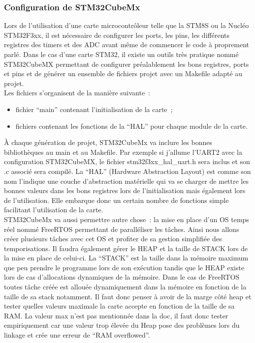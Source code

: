 \documentclass{article}
\begin{document}
\subsubsection{Configuration de STM32CubeMx}

Lors de l'utilisation d'une carte microcontrôleur telle que la STM8S ou la Nucléo STM32F3xx, il est nécessaire de configurer les ports, les pins, les différents registres des timers et des ADC avant même de commencer le code à proprement parlé. Dans le cas d'une carte STM32, il existe un outils très pratique nommé STM32CubeMX permettant de configurer préalablement les bons registres, ports et pins et de générer un ensemble de fichiers projet avec un Makefile adapté au projet. \\

Les fichiers s'organisent de la manière suivante~:
\begin{itemize}
  \item fichier ``main'' contenant l'initialisation de la carte~;
  \item fichiers contenant les fonctions de la ``HAL'' pour chaque module de la carte. 
\end{itemize}

À chaque génération de projet, STM32CubeMx va inclure les bonnes bibliothèques au main et au Makefile. Par exemple si j'allume l'UART2 avec la configuration STM32CubeMX, le fichier stm32f3xx\_hal\_uart.h sera inclus et son .c associé sera compilé. La ``HAL'' (Hardware Abstraction Layout) est comme son nom l'indique une couche d'abstraction matérielle qui va se charger de mettre les bonnes valeurs dans les bons registres lors de l'initialisation mais également lors de l'utilisation. Elle embarque donc un certain nombre de fonctions simple facilitant l'utilisation de la carte. \\

STM32CubeMx va aussi permettre autre chose~: la mise en place d'un OS temps réel nommé FreeRTOS permettant de paralléliser les tâches. Ainsi nous allons créer plusieurs tâches avec cet OS et profiter de sa gestion simplifiée des temporisations. Il faudra également gérer le HEAP et la taille de STACK lors de la mise en place de celui-ci. La ``STACK'' est la taille dans la mémoire maximum que peu prendre le programme lors de son exécution tandis que le HEAP existe lors de cas d'allocations dynamiques de la mémoire. Dans le cas de FreeRTOS toutes tâche créée est allouée dynamiquement dans la mémoire en fonction de la taille de sa stack notamment. Il faut donc penser à avoir de la marge côté heap et tester quelles valeurs maximale la carte accepte en fonction de la taille de sa RAM. La valeur max n'est pas mentionnée dans la doc, il faut donc tester empiriquement car une valeur trop élevée du Heap pose des problèmes lors du linkage et crée une erreur de ``RAM overflowed''. \\
\end{document}
